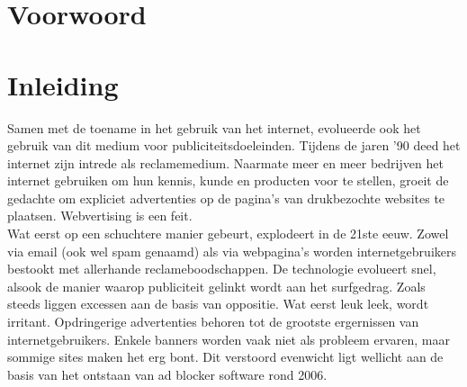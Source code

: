 \documentclass[pdftex,a4paper,12pt,twoside]{report}
\begin{document}
\begin{abstract}

\end{abstract}

\chapter*{Voorwoord}
\label{ch:voorwoord}



\tableofcontents

\printnoidxglossaries


\chapter{Inleiding}
\label{ch:inleiding}

Samen met de toename in het gebruik van het internet, evolueerde ook het gebruik van dit medium voor publiciteitsdoeleinden. Tijdens de jaren ’90 deed het internet zijn intrede als reclamemedium. Naarmate meer en meer bedrijven het internet gebruiken om hun kennis, kunde en producten voor te stellen, groeit de gedachte om expliciet advertenties op de pagina’s van drukbezochte websites te plaatsen. Webvertising is een feit.
\\
Wat eerst op een schuchtere manier gebeurt, explodeert in de 21ste eeuw. Zowel via email (ook wel spam genaamd) als via webpagina’s worden internetgebruikers bestookt met allerhande reclameboodschappen. De technologie evolueert snel, alsook de manier waarop publiciteit gelinkt wordt aan het surfgedrag. Zoals steeds liggen excessen aan de basis van oppositie. Wat eerst leuk leek, wordt irritant. Opdringerige advertenties behoren tot de grootste ergernissen van internetgebruikers. Enkele banners worden vaak niet als probleem ervaren, maar sommige sites maken het erg bont. Dit verstoord evenwicht ligt wellicht aan de basis van het ontstaan van ad blocker software rond 2006.

\end{document}
